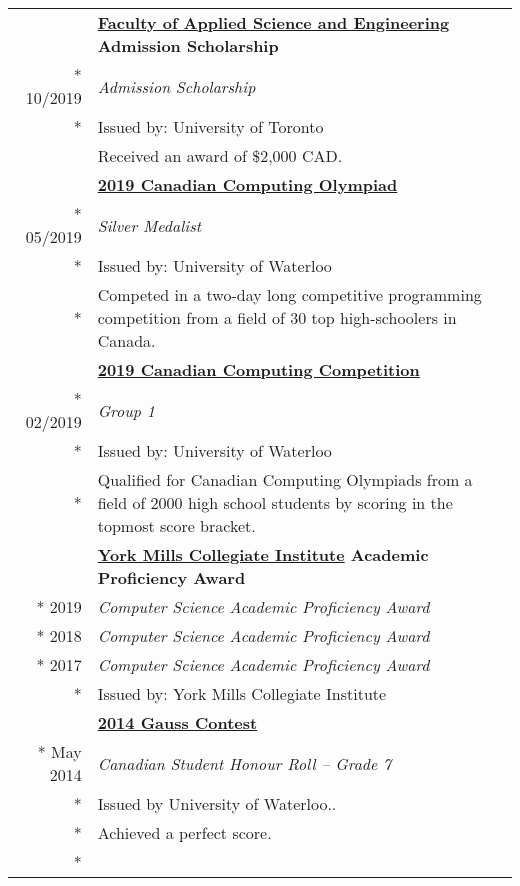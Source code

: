 \documentclass{article}
\begin{document}
\begin{tabularx}{\textwidth}{r X}
{			\addlinespace
			& \textbf{\href{https://www.engineering.utoronto.ca/}{Faculty of Applied Science and Engineering} Admission Scholarship} \\*
			10/2019 & \textit{Admission Scholarship} \\*
			& {\small Issued by: University of Toronto} \\
			& {\small Received an award of \$2,000 CAD.} \\
		}{}
		\addlinespace
		& \textbf{\href{https://www.cemc.uwaterloo.ca/contests/ccc-cco.html}{2019 Canadian Computing Olympiad}} \\*
		05/2019 & \textit{Silver Medalist} \\*
		& {\small Issued by: University of Waterloo} \\*
		& {\small Competed in a two-day long competitive programming competition from a field of 30 top high-schoolers in Canada.} \\
		\iftoggle{verbose}{
			\addlinespace
			& \textbf{\href{https://www.cemc.uwaterloo.ca/contests/ccc-cco.html}{2019 Canadian Computing Competition}} \\*
			02/2019 & \textit{Group 1} \\*
			& {\small Issued by: University of Waterloo} \\*
			& {\small Qualified for Canadian Computing Olympiads from a field of 2000 high school students by scoring in the topmost score bracket.} \\
			\addlinespace
			& \textbf{\href{https://schoolweb.tdsb.on.ca/yorkmillsci/}{York Mills Collegiate Institute} Academic Proficiency Award} \\*
			2019 & \textit{Computer Science Academic Proficiency Award} \\*
			2018 & \textit{Computer Science Academic Proficiency Award} \\*
			2017 & \textit{Computer Science Academic Proficiency Award} \\*
			& {\small Issued by: York Mills Collegiate Institute} \\
			\addlinespace
			& \textbf{\href{https://www.cemc.uwaterloo.ca/contests/gauss.html}{2014 Gauss Contest}} \\*
			May 2014 & \textit{Canadian Student Honour Roll -- Grade 7} \\*
			& {\small Issued by University of Waterloo.}. \\*
			& {\small Achieved a perfect score.} \\*
		}{}
	\end{tabularx}
\end{document}
